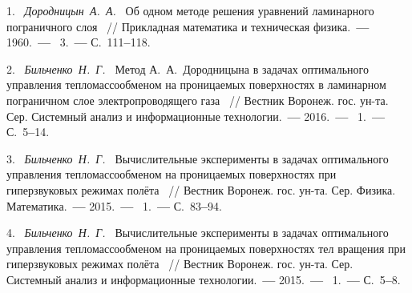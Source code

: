 \litlist



1.~%
\textit%
{Дородницын~А.~А.~}
{%
 {Об  одном  методе  решения
 уравнений  ламинарного  пограничного  слоя}%
~/$\!$/
 {Прикладная  математика
  и  техническая  физика}.~{\textbf{---}}
  1960.~{\textbf{---}}
  \No~3.~{\textbf{---}}
  С.~111{\textbf{--}}118.%
  }



2.~%
\textit%
{Бильченко~Н.~Г.~}
{%
  {Метод  А.~А.~Дородницына
  в  задачах  оптимального  управления
  тепломассообменом  на  проницаемых  поверхностях
  в  ламинарном  пограничном  слое
  электропроводящего  газа}%
~/$\!$/
  Вестник  Воронеж.  гос.  ун-та.
  Сер.  Системный  анализ
  и  информационные  технологии.~{\textbf{---}}
  2016.~{\textbf{---}}
  \No~1.~{\textbf{---}}
  С.~5{\textbf{--}}14.%
  }



3.~%
\textit%
{Бильченко~Н.~Г.~}
{%
 {Вычислительные
  эксперименты
  в
  задачах
  оптимального
  управления
  тепломассообменом
  на  проницаемых  поверхностях
  при  гиперзвуковых  режимах  полёта}%
~/$\!$/
  Вестник  Воронеж.  гос.  ун-та.
  Сер.  Физика.  Математика.~{\textbf{---}}
  2015.~{\textbf{---}}
  \No~1.~{\textbf{---}}
  С.~83{\textbf{--}}94.%
  }



4.~%
\textit%
{Бильченко~Н.~Г.~}
{%
  {Вычислительные
   эксперименты
   в
   задачах
   оптимального
   управления
   тепломассообменом
   на  проницаемых  поверхностях
   тел  вращения
   при  гиперзвуковых  режимах  полёта}%
~/$\!$/
  Вестник  Воронеж.  гос.  ун-та.
  Сер.  Системный  анализ
  и  информационные  технологии.~{\textbf{---}}
  2015.~{\textbf{---}}
  \No~1.~{\textbf{---}}
  С.~5{\textbf{--}}8.%
  }



